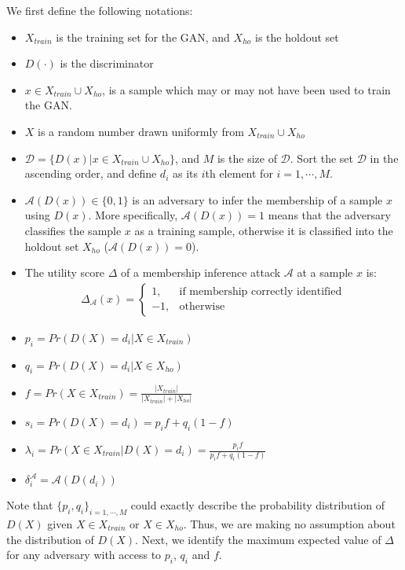 \documentclass{article}
\begin{document}
We first define the following notations: 
\begin{itemize}
\item $X_{train}$ is the training set for the GAN, and $X_{ho}$ is the holdout set
\item  $D(\cdot)$ is the discriminator
    \item $x \in X_{train}\cup X_{ho}$, is a sample which may or may not have been used to train the GAN.
    \item $X$ is a random number drawn uniformly from $X_{train}\cup X_{ho}$
    \item $\mathcal{D} = \{D(x)|x\in X_{train}\cup X_{ho}\}$, and $M$ is the size of $\mathcal{D}$. Sort the set $\mathcal{D}$ in the ascending order, and define $d_i$ as its $i$th element for $i=1,\cdots, M$. 
     \item $\mathcal{A}(D(x))\in\{0,1\}$ is an adversary to infer the membership of a sample $x$ using $D(x)$. More specifically, $\mathcal{A}(D(x))=1$ means that the adversary classifies the sample $x$ as a training sample, otherwise it is classified into the holdout set $X_{ho}$ ($\mathcal{A}(D(x))=0$).   
     \item The utility score $\Delta$ of a membership inference attack $\mathcal{A}$ at a sample $x$ is: 
\begin{align*}
    \Delta_\mathcal{A}(x)= 
    \begin{cases}
    1 ,& \text{if membership correctly identified}\\
    -1, & \text{otherwise}
    \end{cases}
\end{align*}
    \item $p_i = Pr(D(X)= d_i |X \in X_{train})$
    \item $q_i = Pr(D(X) = d_i |X \in X_{ho})$
        \item $f =Pr(X\in X_{train})= \frac{|X_{train}|}{|X_{train}| + |X_{ho}|}$
    \item $s_i = Pr(D(X) = d_i) = p_i f + q_i (1-f)$
    \item $\lambda_i = Pr(X \in X_{train} | D(X) = d_i) = \frac{p_i f}{p_i f + q_i (1-f) }$
    \item $\delta^\mathcal{A}_i = \mathcal{A}(D(d_i)) $
\end{itemize}
Note that $\{p_i,q_i\}_{i=1,\cdots,M}$ could exactly describe the probability distribution of $D(X)$ given $X\in X_{train}$ or $X\in X_{ho}$. Thus, we are making no assumption about the distribution of $D(X)$. Next, we identify the maximum expected value of $\Delta$ for any adversary with access to $p_i$, $q_i$ and $f$.
\end{document}
